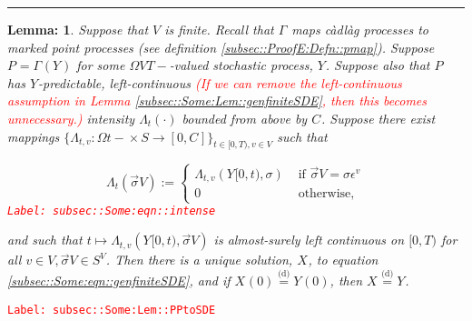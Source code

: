 \documentclass[12pt]{article}
\newcommand{\ra}{\rightarrow}
\newcommand{\te}{\text}
\newcommand{\ep}{\epsilon}
\newcommand{\tr}{\textcolor{red}}
\newcommand{\labe}[1]{\tr{\texttt{Label: #1}}}
\newcommand{\lin}{\rule{\linewidth}{0.4 pt}}
\newcommand{\deq}{\overset{\text{(d)}}{=}}			%
\renewcommand{\v}{v}							%
\renewcommand{\S}{S}							%
\newcommand{\s}{\sigma}							%
\newcommand{\sv}{\vec{\s}}						%
\newcommand{\ev}[1]{\ep^{#1}}					%
\newcommand{\T}{T}								%
\renewcommand{\t}{t}							%
\newcommand{\V}{V}									%
\newcommand{\XState}[1]{\S^{#1}}				%
\newcommand{\rxvt}[2]{X_{#1}{(#2)}}					%
\newcommand{\rxvtt}[2]{Y_{#1}{(#2)}}				%
\newcommand{\rxvts}[2]{X_{#1}{#2}}					%
\newcommand{\rxvtts}[2]{Y_{#1}{#2}}					%
\newcommand{\rp}[1]{P^{#1}}							%
\newcommand{\ratee}[1]{\Lambda_{#1}}				%
\newcommand{\const}[1]{C_{#1}}						%
\newcommand{\pmap}[1]{\Gamma_{#1}}				%
\newtheorem{lem}[thms]{Lemma: }
\begin{document}
\lin

\begin{lem}
Suppose that \(\V\) is finite. Recall that \(\pmap{}\) maps c\`adl\`ag processes to marked point processes (see definition \ref{subsec::ProofE:Defn::pmap}). Suppose \(\rp{} = \pmap{}(\rxvtts{}{})\) for some \(\Omega{\V}{\T-}\)-valued stochastic process, \(\rxvtts{}{}\). Suppose also that \(\rp{}\) has \(\rxvtts{}{}\)-predictable, left-continuous \tr{(If we can remove the left-continuous assumption in Lemma \ref{subsec::Some:Lem::genfiniteSDE}, then this becomes unnecessary.)} intensity \(\ratee{\t}(\cdot)\) bounded from above by \(\const{}\). Suppose there exist mappings \(\{\ratee{\t,\v}:\Omega{}{\t-}\times \S \ra [0,\const{}]\}_{\t\in[0,\T),\v\in \V}\) such that 

\begin{equation}
\ratee{\t}(\sv{}{\V}) := \begin{cases}
\ratee{\t,\v}(\rxvtts{}{[0,\t)},\s) &\te{ if } \sv{}{\V} = \s\ev{\v}\\
0 &\te{ otherwise,}
\end{cases}
\label{subsec::Some:eqn::intense}
\end{equation}
\labe{subsec::Some:eqn::intense}

and such that \(\t\mapsto \ratee{\t,\v}(\rxvtts{}{[0,\t)},\sv{}{\V})\) is almost-surely left continuous on \([0,\T)\) for all \(\v\in \V,\sv{}{\V}\in \S^\V\). Then there is a unique solution, \(\rxvts{}{}\), to equation \eqref{subsec::Some:eqn::genfiniteSDE}, and if \(\rxvt{}{0} \deq \rxvtt{}{0}\), then \(\rxvts{}{} \deq \rxvtts{}{}\).

\label{subsec::Some:Lem::PPtoSDE}
\end{lem}
\labe{subsec::Some:Lem::PPtoSDE}
\end{document}
